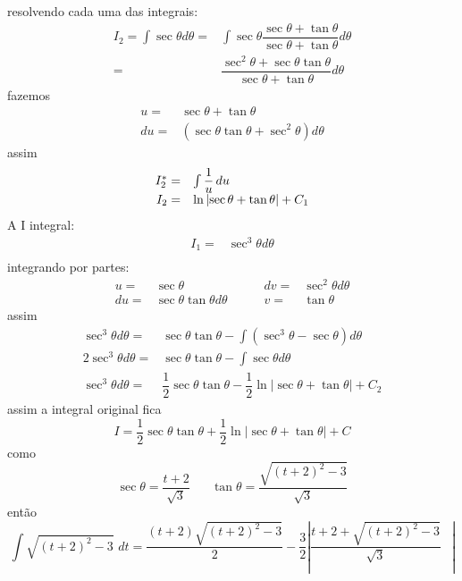\documentclass[a4papper,12pt]{article}
\begin{document}
        resolvendo cada uma das integrais:
        \[
          \begin{array}{rl}
            I_2 = \int \sec \theta d\theta 
             =&\int \sec \theta \dfrac{\sec \theta + \tan \theta}{\sec \theta + \tan \theta} d\theta \nonumber\\
            =& \dfrac{\sec ^2 \theta + \sec \theta \tan \theta}{\sec \theta + \tan \theta} d\theta \nonumber
          \end{array}
        \]
        fazemos
        \[
          \begin{array}{rl}
            u  =& \sec \theta + \tan \theta \nonumber\\
            du =& \left( \sec \theta  \tan \theta + \sec^2 \theta\right) d\theta \nonumber
          \end{array}
        \]
        assim
        \[
          \begin{array}{r l}
            I_2^* =& \int \dfrac{1}{u}\,du\nonumber\\
            I_2=& \ln \left| \sec \theta + \tan \theta \right| + C_1\nonumber
          \end{array}
        \]
        A I integral:
        \[
          \begin{array}{rl}
          I_1 =& \sec ^3 \theta d\theta\nonumber\\
          \end{array}
        \]
        integrando por partes:
        \[
          \begin{array}{rlcrl}
          u =& \sec \theta &\;\;\;\;\ & dv =& \sec ^2 \theta d\theta\nonumber\\
          du =& \sec \theta  \tan \theta d\theta & & v =& \tan \theta \nonumber
          \end{array}
        \]
        assim
      \[
          \begin{array}{rl}
            \sec ^3 \theta d\theta  =& \sec \theta  \tan \theta - \int \left( \sec ^3 \theta - \sec \theta \right)d\theta \nonumber\\
            2\sec ^3 \theta d\theta  =& \sec \theta  \tan \theta - \int \sec \theta d\theta \nonumber\\
            \sec ^3 \theta d\theta  =& \dfrac{1}{2}\sec \theta  \tan \theta - \dfrac{1}{2} \ln \left| \sec \theta + \tan \theta \right| + C_2\nonumber
          \nonumber
          \end{array}
        \]
        assim a integral original fica
        \[
          I = \dfrac{1}{2}\sec \theta  \tan \theta + \dfrac{1}{2} \ln \left| \sec \theta + \tan \theta \right| + C\nonumber
        \]
        como
        \[
          \sec \theta = \dfrac{t+2}{\sqrt{3}}\;\;\;\;\;\; \tan \theta = \dfrac{\sqrt{(t+2)^2 -3}}{\sqrt{3}}\nonumber
        \]
        então
        \[
          \int \sqrt{(t+2)^2 -3}\,\,dt = \dfrac{\left(t+2 \right)\sqrt{(t+2)^2 -3}}{2} - \frac{3}{2}\left| \dfrac{t+2+\sqrt{(t+2)^2 -3}}{\sqrt{3}} \;\;\;\right|\nonumber
        \]
\end{document}

